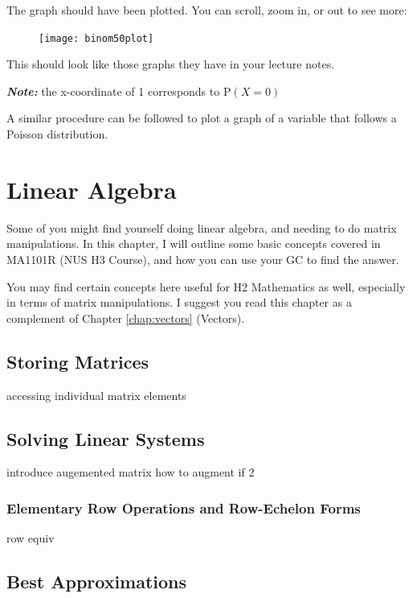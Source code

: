 \documentclass[a5paper]{memoir}
\def\note#1{\textcolor[HTML]{109fa9}{\textbf{\textit{Note:}}} #1}
\begin{document}
The graph should have been plotted. You can scroll, zoom in, or out to see more:

\begin{figure}[h]
	\centering
	\texttt{[image: binom50plot]}
\end{figure}

This should look like those graphs they have in your lecture notes.

\note{the x-coordinate of 1 corresponds to $\text{P}(X=0)$}

A similar procedure can be followed to plot a graph of a variable that follows a Poisson distribution.

\chapter{Linear Algebra} \label{chap:linalge}
Some of you might find yourself doing linear algebra, and needing to do matrix manipulations. In this chapter, I will outline some basic concepts covered in MA1101R (NUS H3 Course), and how you can use your GC to find the answer.

You may find certain concepts here useful for H2 Mathematics as well, especially in terms of matrix manipulations. I suggest you read this chapter as a complement of Chapter \ref{chap:vectors} (Vectors). 

\section{Storing Matrices}
accessing individual matrix elements

\section{Solving Linear Systems} \label{sec:solvLinSys}
introduce augemented matrix
how to augment if 2

\subsection{Elementary Row Operations and Row-Echelon Forms}
row equiv

\section{Best Approximations} \label{sec:bestapprox}

\cleardoublepage
\printindex
\end{document}
